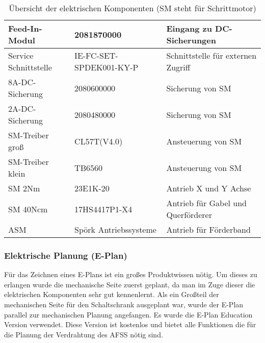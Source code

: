 \begin{table}[h!]
\begin{tabular}{|l|l|l|}
            Feed-In-Modul & 2081870000 & Eingang zu DC-Sicherungen \\ \hline            
            Service Schnittstelle & IE-FC-SET-SPDEK001-KY-P & Schnittstelle für externen Zugriff \\ \hline
            8A-DC-Sicherung & 2080600000 & Sicherung von SM \\ \hline
            2A-DC-Sicherung & 2080480000 & Sicherung von SM \\ \hline
            SM-Treiber groß & CL57T(V4.0) & Ansteuerung von SM \\ \hline
            SM-Treiber klein & TB6560 & Ansteuerung von SM \\ \hline
            SM 2Nm & 23E1K-20 & Antrieb X und Y Achse \\ \hline
            SM 40Ncm & 17HS4417P1-X4 & Antrieb für Gabel und Querförderer \\ \hline
            ASM & Spörk Antriebssysteme & Antrieb für Förderband \\ \hline
        \end{tabular}
        \caption{Übersicht der elektrischen Komponenten (SM steht für Schrittmotor)}
        \label{tab:elektrische_komponenten}
    \end{table}
\subsubsection{Elektrische Planung (E-Plan)}
\label{sec:Elektrische Planung}
    Für das Zeichnen eines E-Plans ist ein großes Produktwissen nötig. Um dieses zu erlangen wurde die mechanische Seite zuerst geplant, da man im  Zuge dieser die elektrischen Komponenten sehr gut kennenlernt. Als ein Großteil der mechanischen Seite für den Schaltschrank ausgeplant war, wurde der E-Plan parallel zur mechanischen Planung angefangen. Es wurde die E-Plan Education Version verwendet. Diese Version ist kostenlos und bietet alle Funktionen die für die Planung der Verdrahtung des AFSS nötig sind.
